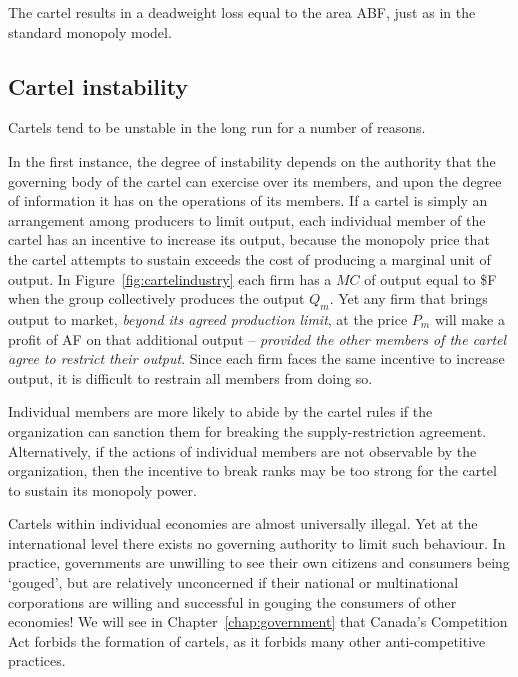 

The cartel results in a deadweight loss equal to the area ABF, just as in
the standard monopoly model.

\newhtmlpage

\subsection*{Cartel instability}

Cartels tend to be unstable in the long run for a number of reasons. 

In the first instance, the degree of instability depends on the authority
that the governing body of the cartel can exercise over its members, and
upon the degree of information it has on the operations of its members. If a
cartel is simply an arrangement among producers to limit output, each
individual member of the cartel has an incentive to increase its output,
because the monopoly price that the cartel attempts to sustain exceeds the
cost of producing a marginal unit of output. In Figure~\ref{fig:cartelindustry}
each firm has a $MC$ of output equal to \$F when the
group collectively produces the output $Q_{m}$. Yet any firm that brings
output to market, \textit{beyond its agreed production limit}, at the price 
$P_{m}$ will make a profit of AF on that additional output -- 
\textit{provided the other members of the cartel agree to restrict their output}.
Since each firm faces the same incentive to increase output, it is difficult
to restrain all members from doing so.

Individual members are more likely to abide by the cartel rules if the
organization can sanction them for breaking the supply-restriction
agreement. Alternatively, if the actions of individual members are not
observable by the organization, then the incentive to break ranks may be too
strong for the cartel to sustain its monopoly power.

Cartels within individual economies are almost universally illegal. Yet at
the international level there exists no governing authority to limit such
behaviour. In practice, governments are unwilling to see their own citizens
and consumers being `gouged', but are relatively unconcerned if their
national or multinational corporations are willing and successful in gouging
the consumers of other economies! We will see in Chapter~\ref{chap:government}
that Canada's Competition Act forbids the formation of
cartels, as it forbids many other anti-competitive practices.

